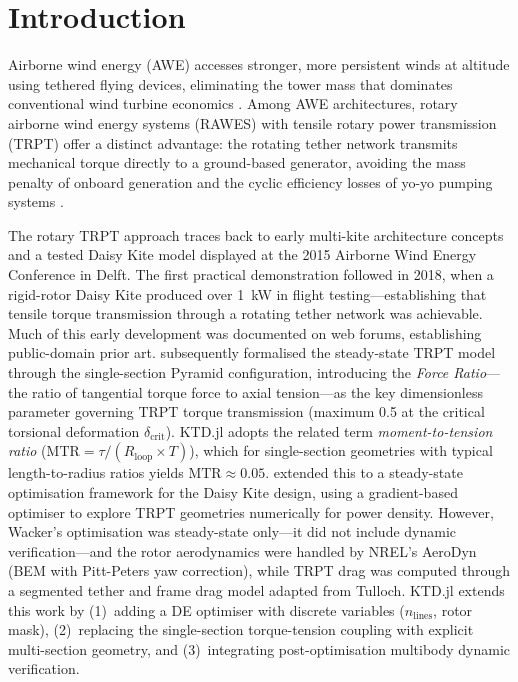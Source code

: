 \documentclass[11pt,a4paper]{article}
\begin{document}
\section{Introduction}

Airborne wind energy (AWE) accesses stronger, more persistent winds at altitude using tethered flying devices, eliminating the tower mass that dominates conventional wind turbine economics \cite{loyd1980,diehl2013}. Among AWE architectures, rotary airborne wind energy systems (RAWES) with tensile rotary power transmission (TRPT) offer a distinct advantage: the rotating tether network transmits mechanical torque directly to a ground-based generator, avoiding the mass penalty of onboard generation and the cyclic efficiency losses of yo-yo pumping systems \cite{tulloch2023}.

The rotary TRPT approach traces back to early multi-kite architecture concepts \cite{read2013} and a tested Daisy Kite model displayed at the 2015 Airborne Wind Energy Conference in Delft. The first practical demonstration followed in 2018, when a rigid-rotor Daisy Kite produced over 1~kW in flight testing—establishing that tensile torque transmission through a rotating tether network was achievable. Much of this early development was documented on web forums, establishing public-domain prior art. \cite{tulloch2023,tulloch2021} subsequently formalised the steady-state TRPT model through the single-section Pyramid configuration, introducing the \emph{Force Ratio}—the ratio of tangential torque force to axial tension—as the key dimensionless parameter governing TRPT torque transmission (maximum 0.5 at the critical torsional deformation $\delta_{\mathrm{crit}}$). KTD.jl adopts the related term \emph{moment-to-tension ratio} ($\mathrm{MTR} = \tau / (R_{\mathrm{loop}} \times T)$), which for single-section geometries with typical length-to-radius ratios yields $\mathrm{MTR} \approx 0.05$. \cite{wacker2022} extended this to a steady-state optimisation framework for the Daisy Kite design, using a gradient-based optimiser to explore TRPT geometries numerically for power density. However, Wacker's optimisation was steady-state only—it did not include dynamic verification—and the rotor aerodynamics were handled by NREL's AeroDyn (BEM with Pitt-Peters yaw correction), while TRPT drag was computed through a segmented tether and frame drag model adapted from Tulloch. KTD.jl extends this work by (1)~adding a DE optimiser with discrete variables ($n_{\mathrm{lines}}$, rotor mask), (2)~replacing the single-section torque-tension coupling with explicit multi-section geometry, and (3)~integrating post-optimisation multibody dynamic verification.
\end{document}
